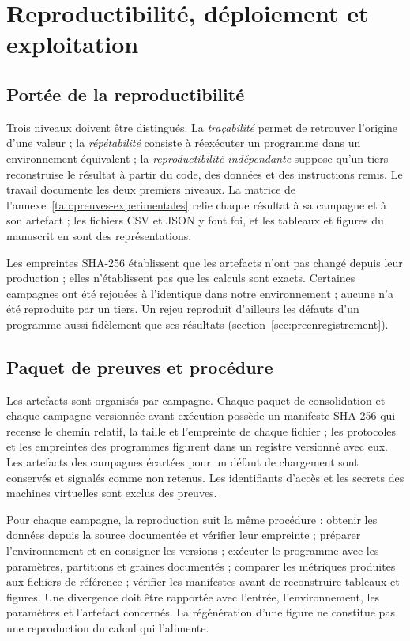 \chapter{Reproductibilité, déploiement et exploitation}
\label{chap:reproductibilite}

\section{Portée de la reproductibilité}

Trois niveaux doivent être distingués. La \emph{traçabilité} permet de retrouver l'origine
d'une valeur ; la \emph{répétabilité} consiste à réexécuter un programme dans un
environnement équivalent ; la \emph{reproductibilité indépendante} suppose qu'un tiers
reconstruise le résultat à partir du code, des données et des instructions remis. Le
travail documente les deux premiers niveaux. La matrice de
l'annexe~\ref{tab:preuves-experimentales} relie chaque résultat à sa campagne et à son
artefact ; les fichiers CSV et JSON y font foi, et les tableaux et figures du manuscrit en
sont des représentations.

Les empreintes SHA-256 établissent que les artefacts n'ont pas changé depuis leur
production ; elles n'établissent pas que les calculs sont exacts. Certaines campagnes ont été
rejouées à l'identique dans notre environnement ; aucune n'a été reproduite par un
tiers. Un rejeu reproduit d'ailleurs les défauts d'un programme aussi fidèlement que ses
résultats (section~\ref{sec:preenregistrement}).

\section{Paquet de preuves et procédure}

Les artefacts sont organisés par campagne. Chaque paquet de consolidation et chaque
campagne versionnée avant exécution possède un manifeste SHA-256 qui recense le chemin
relatif, la taille et l'empreinte de chaque fichier ; les protocoles et les empreintes des
programmes figurent dans un registre versionné avec eux. Les artefacts des campagnes écartées
pour un défaut de chargement sont conservés et signalés comme non retenus. Les identifiants
d'accès et les secrets des machines virtuelles sont exclus des preuves.

Pour chaque campagne, la reproduction suit la même procédure : obtenir les données depuis la
source documentée et vérifier leur empreinte ; préparer l'environnement et en consigner les
versions ; exécuter le programme avec les paramètres, partitions et graines documentés ;
comparer les métriques produites aux fichiers de référence ; vérifier les manifestes avant de
reconstruire tableaux et figures. Une divergence doit être rapportée avec l'entrée,
l'environnement, les paramètres et l'artefact concernés. La régénération d'une figure ne
constitue pas une reproduction du calcul qui l'alimente.

